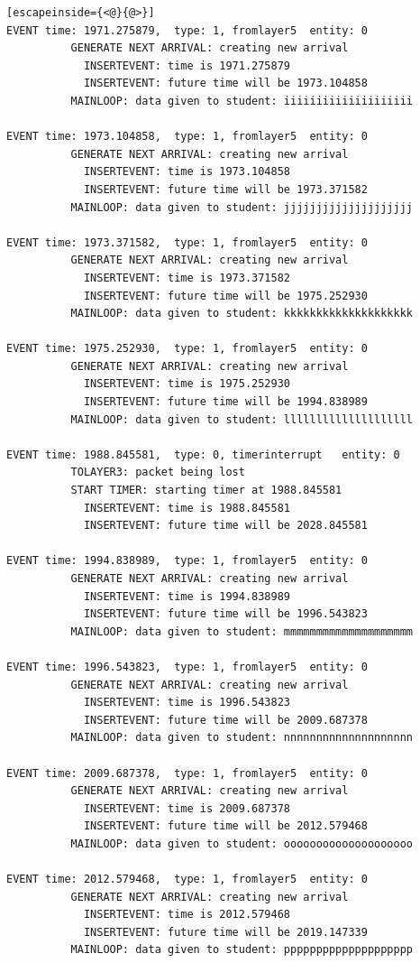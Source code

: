 \documentclass[paper=a4, fontsize=11pt]{scrartcl}
\numberwithin{equation}{section}		%
\numberwithin{figure}{section}			%
\numberwithin{table}{section}				%
\begin{document}
\begin{lstlisting}[escapeinside={<@}{@>}]
EVENT time: 1971.275879,  type: 1, fromlayer5  entity: 0
          GENERATE NEXT ARRIVAL: creating new arrival
            INSERTEVENT: time is 1971.275879
            INSERTEVENT: future time will be 1973.104858
          MAINLOOP: data given to student: iiiiiiiiiiiiiiiiiiii

EVENT time: 1973.104858,  type: 1, fromlayer5  entity: 0
          GENERATE NEXT ARRIVAL: creating new arrival
            INSERTEVENT: time is 1973.104858
            INSERTEVENT: future time will be 1973.371582
          MAINLOOP: data given to student: jjjjjjjjjjjjjjjjjjjj

EVENT time: 1973.371582,  type: 1, fromlayer5  entity: 0
          GENERATE NEXT ARRIVAL: creating new arrival
            INSERTEVENT: time is 1973.371582
            INSERTEVENT: future time will be 1975.252930
          MAINLOOP: data given to student: kkkkkkkkkkkkkkkkkkkk

EVENT time: 1975.252930,  type: 1, fromlayer5  entity: 0
          GENERATE NEXT ARRIVAL: creating new arrival
            INSERTEVENT: time is 1975.252930
            INSERTEVENT: future time will be 1994.838989
          MAINLOOP: data given to student: llllllllllllllllllll

EVENT time: 1988.845581,  type: 0, timerinterrupt   entity: 0
          TOLAYER3: packet being lost
          START TIMER: starting timer at 1988.845581
            INSERTEVENT: time is 1988.845581
            INSERTEVENT: future time will be 2028.845581

EVENT time: 1994.838989,  type: 1, fromlayer5  entity: 0
          GENERATE NEXT ARRIVAL: creating new arrival
            INSERTEVENT: time is 1994.838989
            INSERTEVENT: future time will be 1996.543823
          MAINLOOP: data given to student: mmmmmmmmmmmmmmmmmmmm

EVENT time: 1996.543823,  type: 1, fromlayer5  entity: 0
          GENERATE NEXT ARRIVAL: creating new arrival
            INSERTEVENT: time is 1996.543823
            INSERTEVENT: future time will be 2009.687378
          MAINLOOP: data given to student: nnnnnnnnnnnnnnnnnnnn

EVENT time: 2009.687378,  type: 1, fromlayer5  entity: 0
          GENERATE NEXT ARRIVAL: creating new arrival
            INSERTEVENT: time is 2009.687378
            INSERTEVENT: future time will be 2012.579468
          MAINLOOP: data given to student: oooooooooooooooooooo

EVENT time: 2012.579468,  type: 1, fromlayer5  entity: 0
          GENERATE NEXT ARRIVAL: creating new arrival
            INSERTEVENT: time is 2012.579468
            INSERTEVENT: future time will be 2019.147339
          MAINLOOP: data given to student: pppppppppppppppppppp


\end{lstlisting}
\end{document}
